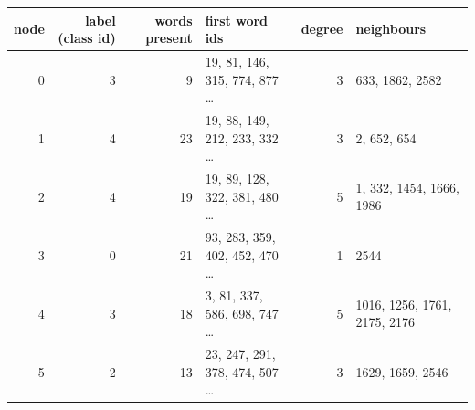 \begin{tabular}{rrrlrl}
\toprule
node & label (class id) & words present & first word ids & degree & neighbours \\
\midrule
0 & 3 & 9 & 19, 81, 146, 315, 774, 877 … & 3 & 633, 1862, 2582 \\
1 & 4 & 23 & 19, 88, 149, 212, 233, 332 … & 3 & 2, 652, 654 \\
2 & 4 & 19 & 19, 89, 128, 322, 381, 480 … & 5 & 1, 332, 1454, 1666, 1986 \\
3 & 0 & 21 & 93, 283, 359, 402, 452, 470 … & 1 & 2544 \\
4 & 3 & 18 & 3, 81, 337, 586, 698, 747 … & 5 & 1016, 1256, 1761, 2175, 2176 \\
5 & 2 & 13 & 23, 247, 291, 378, 474, 507 … & 3 & 1629, 1659, 2546 \\
\bottomrule
\end{tabular}
